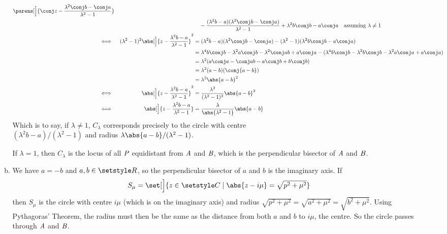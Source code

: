 \documentclass[fleqn,a4paper,11pt]{article}
\begin{document}
\begin{enumerate}
\begin{enumerate}[(a)]
{\begin{alignat*}
                     \parens[\Big]{\conj z - \frac{\lambda^2 \conj b - \conj a}
                                                  {\lambda^2 - 1}} \\
       &&         &\phantom{={}}
                     - \frac{(\lambda^2 b - a)(\lambda^2 \conj b - \conj a)}
                            {\lambda^2 - 1}
                     + \lambda^2 b\conj b - a\conj a \quad
                                           \text{assuming \(\lambda \ne 1\)}\\
       \iff{}&&
                 (\lambda^2 - 1)^2
                     \abs[\Big]{z - \frac{\lambda^2 b - a}{\lambda^2 - 1}}^2
                  &=
                     (\lambda^2 b - a)(\lambda^2 \conj b - \conj a)
                     - (\lambda^2 - 1)(\lambda^2 b\conj b - a\conj a) \\
       &&         &= \lambda^4 b\conj b - \lambda^2 a\conj b
                     - \lambda^2 \conj ab + a\conj a
                     - (\lambda^4 b\conj b - \lambda^2 b\conj b
                     - \lambda^2 a\conj a + a\conj a) \\
       &&         &= \lambda^2(a\conj a - \conj a b - a\conj b + b\conj b) \\
       &&         &= \lambda^2(a - b)(\conj{a - b}) \\
       &&         &= \lambda^2\abs{a - b}^2 \\
       \iff{}&& \abs[\Big]{z - \frac{\lambda^2 b - a}{\lambda^2 - 1}}^2
                  &= \frac{\lambda^2}{(\lambda^2 - 1)^2}\abs{a - b}^2 \\
       \iff{}&& \abs[\Big]{z - \frac{\lambda^2 b - a}{\lambda^2 - 1}}
                  &= \frac{\lambda}{\abs{\lambda^2 - 1}}\abs{a - b}
      \end{alignat*}}
      Which is to say, if \(\lambda \ne 1\), \(C_\lambda\) corresponds precisely
      to the circle with centre \\ \((\lambda^2 b - a) / (\lambda^2 - 1)\) and
      radius \(\lambda \abs{a - b} / (\lambda^2 - 1)\).

      If \(\lambda = 1\), then \(C_\lambda\) is the locus of all \(\mathit{P}\)
      equidistant from \(\mathit{A}\) and \(\mathit{B}\), which is the perpendicular
      bisector of \(\mathit{A}\) and \(\mathit{B}\).
     \item
      We have \(a = -b\) and \(a, b \in \Reals\), so the perpendicular bisector
      of \(a\) and \(b\) is the imaginary axis. If
      \begin{equation*}
       S_\mu = \set[\Big]{z \in \Complex \mid
                          \abs{z - i\mu} = \textstyle\sqrt{p^2 + \mu^2}}
      \end{equation*}
      then \(S_\mu\) is the circle with centre \(i\mu\) (which is on the
      imaginary axis) and radius
      \(\sqrt{p^2 + \mu^2} = \sqrt{a^2 + \mu^2} = \sqrt{b^2 + \mu^2}\). Using
      Pythagoras' Theorem, the radius must then be the same as the distance from
      both \(a\) and \(b\) to \(i\mu\), the centre. So the circle passes through
      \(\mathit{A}\) and \(\mathit{B}\).


\end{enumerate}
\end{enumerate}
\end{document}
